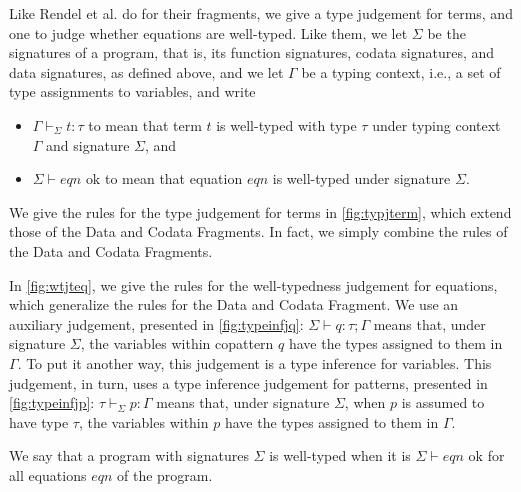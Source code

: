 Like Rendel et al. do for their fragments, we give a type judgement for terms, and one to judge whether equations are well-typed.  Like them, we let $\Sigma$ be the signatures of a program, that is, its function signatures, codata signatures, and data signatures, as defined above, and we let $\Gamma$ be a typing context, i.e., a set of type assignments to variables, and write
\begin{itemize}
\item $\Gamma \vdash_{\Sigma} t : \tau$ to mean that term $t$ is well-typed with type $\tau$ under typing context $\Gamma$ and signature $\Sigma$, and

\item $\Sigma \vdash eqn \textrm{ ok}$ to mean that equation $eqn$ is well-typed under signature $\Sigma$.
\end{itemize}
We give the rules for the type judgement for terms in \autoref{fig:typjterm}, which extend those of the Data and Codata Fragments. In fact, we simply combine the rules of the Data and Codata Fragments.


In \autoref{fig:wtjteq}, we give the rules for the well-typedness judgement for equations, which generalize the rules for the Data and Codata Fragment. We use an auxiliary judgement, presented in \autoref{fig:typeinfjq}: $\Sigma \vdash q : \tau; \Gamma$ means that, under signature $\Sigma$, the variables within copattern $q$ have the types assigned to them in $\Gamma$. To put it another way, this judgement is a type inference for variables. This judgement, in turn, uses a type inference judgement for patterns, presented in \autoref{fig:typeinfjp}: $\tau \vdash_{\Sigma} p : \Gamma$ means that, under signature $\Sigma$, when $p$ is assumed to have type $\tau$, the variables within $p$ have the types assigned to them in $\Gamma$.

We say that a program with signatures $\Sigma$ is well-typed when it is $\Sigma \vdash eqn \textrm{ ok}$ for all equations $eqn$ of the program.

